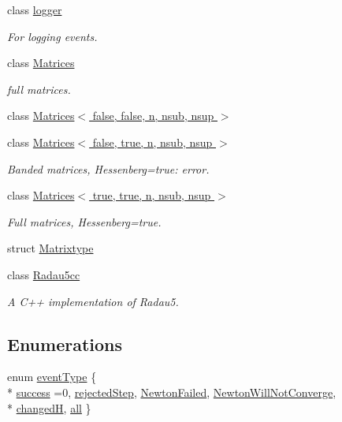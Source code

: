 \begin{DoxyCompactItemize}
class \hyperlink{classodes_1_1logger}{logger}
\begin{DoxyCompactList}\small\item\em For logging events. \end{DoxyCompactList}\item 
class \hyperlink{classodes_1_1Matrices}{Matrices}
\begin{DoxyCompactList}\small\item\em full matrices. \end{DoxyCompactList}\item 
class \hyperlink{classodes_1_1Matrices_3_01false_00_01false_00_01n_00_01nsub_00_01nsup_01_4}{Matrices$<$ false, false, n, nsub, nsup $>$}
\item 
class \hyperlink{classodes_1_1Matrices_3_01false_00_01true_00_01n_00_01nsub_00_01nsup_01_4}{Matrices$<$ false, true, n, nsub, nsup $>$}
\begin{DoxyCompactList}\small\item\em Banded matrices, Hessenberg=true\+: error. \end{DoxyCompactList}\item 
class \hyperlink{classodes_1_1Matrices_3_01true_00_01true_00_01n_00_01nsub_00_01nsup_01_4}{Matrices$<$ true, true, n, nsub, nsup $>$}
\begin{DoxyCompactList}\small\item\em Full matrices, Hessenberg=true. \end{DoxyCompactList}\item 
struct \hyperlink{structodes_1_1Matrixtype}{Matrixtype}
\item 
class \hyperlink{classodes_1_1Radau5cc}{Radau5cc}
\begin{DoxyCompactList}\small\item\em A C++ implementation of Radau5. \end{DoxyCompactList}\end{DoxyCompactItemize}
\subsection*{Enumerations}
\begin{DoxyCompactItemize}
\item 
enum \hyperlink{namespaceodes_a0e9924dcd4d2b0cedc36ec2eff4dcba8}{event\+Type} \{ \\*
\hyperlink{namespaceodes_a0e9924dcd4d2b0cedc36ec2eff4dcba8ad4b896da4797189f441c09833809cd9b}{success} =0, 
\hyperlink{namespaceodes_a0e9924dcd4d2b0cedc36ec2eff4dcba8a63543747bb83162c25560885509e7ee2}{rejected\+Step}, 
\hyperlink{namespaceodes_a0e9924dcd4d2b0cedc36ec2eff4dcba8ab34441382e71cf7d70c345be11743cee}{Newton\+Failed}, 
\hyperlink{namespaceodes_a0e9924dcd4d2b0cedc36ec2eff4dcba8aa3c3a7a051ec8570634a29155a6b62e0}{Newton\+Will\+Not\+Converge}, 
\\*
\hyperlink{namespaceodes_a0e9924dcd4d2b0cedc36ec2eff4dcba8a00d366881a9a224a0e426eb018f1db23}{changed\+H}, 
\hyperlink{namespaceodes_a0e9924dcd4d2b0cedc36ec2eff4dcba8ad985883a2a443d3b103d6b312caefef2}{all}
 \}
\end{DoxyCompactItemize}
